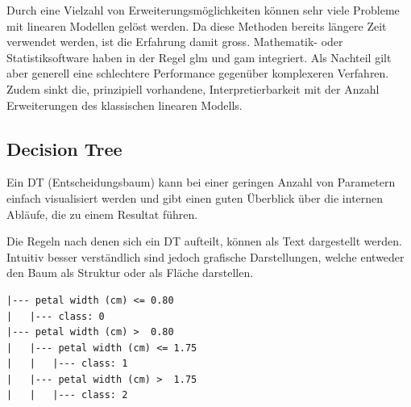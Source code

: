 \documentclass[
  12pt, %
  a4paper, %
  oneside, %
  openany, 
  numbers=noenddot, %
  BCOR=5mm, %
  parskip=half*, %
  thesis, %
]{bfhbook}
\begin{document}
Durch eine Vielzahl von Erweiterungsmöglichkeiten können sehr viele Probleme mit linearen Modellen gelöst werden. Da diese Methoden bereits längere Zeit verwendet werden, ist die Erfahrung damit gross. Mathematik- oder Statistiksoftware haben in der Regel \gls{glm} und \gls{gam} integriert. Als Nachteil gilt aber generell eine schlechtere Performance gegenüber komplexeren Verfahren. Zudem sinkt die, prinzipiell vorhandene, Interpretierbarkeit mit der Anzahl Erweiterungen des klassischen linearen Modells.

\subsection{Decision Tree}
\label{DT}
Ein \Gls{DT} (Entscheidungsbaum) kann bei einer geringen Anzahl von Parametern einfach visualisiert werden und gibt einen guten Überblick über die internen Abläufe, die zu einem Resultat führen.

\begin{minipage}[t]{0.45\linewidth}
\vspace{10pt}
Die Regeln nach denen sich ein \Gls{DT} aufteilt, können als Text dargestellt werden. Intuitiv besser verständlich sind jedoch grafische Darstellungen, welche entweder den Baum als Struktur oder als Fläche darstellen.
\end{minipage}\hfill
\begin{minipage}[t]{0.45\linewidth}
\begin{lstlisting}
|--- petal width (cm) <= 0.80
|   |--- class: 0
|--- petal width (cm) >  0.80
|   |--- petal width (cm) <= 1.75
|   |   |--- class: 1
|   |--- petal width (cm) >  1.75
|   |   |--- class: 2
\end{lstlisting}
\end{minipage}
\end{document}
